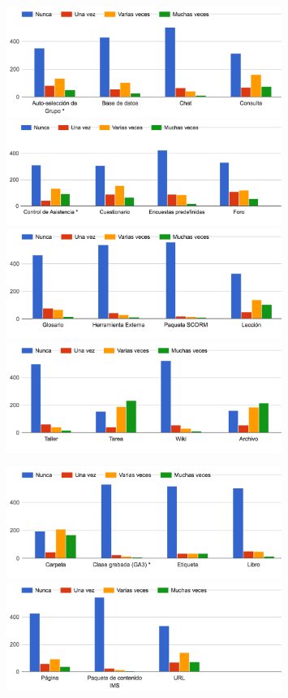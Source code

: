 \begin{enumerate}
\begin{figure}[H]
\centering
\includegraphics[width=0.8\textwidth]{../charts/05_actividades_01}
\includegraphics[width=0.8\textwidth]{../charts/05_actividades_02}
\includegraphics[width=0.8\textwidth]{../charts/05_actividades_03}
\includegraphics[width=0.8\textwidth]{../charts/05_actividades_04}
\end{figure}
\begin{figure}[H]
\centering
\includegraphics[width=0.8\textwidth]{../charts/05_actividades_05}
\includegraphics[width=0.8\textwidth]{../charts/05_actividades_06}


\end{figure}
\end{enumerate}
